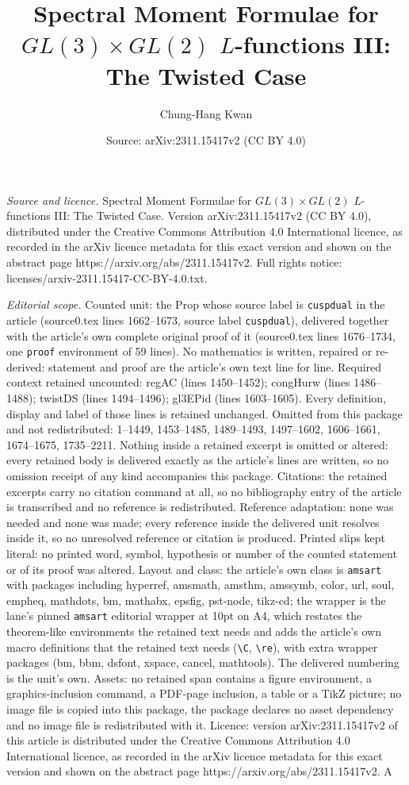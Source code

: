 \documentclass[10pt,a4paper]{amsart}
\title[Spectral Moment Formulae for $GL(3)\times GL(2)$ $L$-functio]{Spectral Moment Formulae for $GL(3)\times GL(2)$ $L$-functions III: The Twisted Case}
\author{Chung-Hang Kwan}
\date{Source: arXiv:2311.15417v2 (CC BY 4.0)}
\begin{document}
\maketitle

\noindent\emph{Source and licence.} Spectral Moment Formulae for $GL(3)\times GL(2)$ $L$-functions III: The Twisted Case. Version arXiv:2311.15417v2 (CC BY 4.0), distributed under the Creative Commons Attribution 4.0 International licence, as recorded in the arXiv licence metadata for this exact version and shown on the abstract page https://arxiv.org/abs/2311.15417v2. Full rights notice: licenses/arxiv-2311.15417-CC-BY-4.0.txt.\par\smallskip

\noindent\textit{Editorial scope.} Counted unit: the Prop whose source label is \texttt{cuspdual} in the article (source0.tex lines 1662--1673, source label \texttt{cuspdual}), delivered together with the article's own complete original proof of it (source0.tex lines 1676--1734, one \texttt{proof} environment of 59 lines). No mathematics is written, repaired or re-derived: statement and proof are the article's own text line for line. Required context retained uncounted: regAC (lines 1450--1452); congHurw (lines 1486--1488); twistDS (lines 1494--1496); gl3EPid (lines 1603--1605). Every definition, display and label of those lines is retained unchanged. Omitted from this package and not redistributed: 1--1449, 1453--1485, 1489--1493, 1497--1602, 1606--1661, 1674--1675, 1735--2211. Nothing inside a retained excerpt is omitted or altered: every retained body is delivered exactly as the article's lines are written, so no omission receipt of any kind accompanies this package. Citations: the retained excerpts carry no citation command at all, so no bibliography entry of the article is transcribed and no reference is redistributed. Reference adaptation: none was needed and none was made; every reference inside the delivered unit resolves inside it, so no unresolved reference or citation is produced. Printed slips kept literal: no printed word, symbol, hypothesis or number of the counted statement or of its proof was altered. Layout and class: the article's own class is \texttt{amsart} with packages including hyperref, amsmath, amsthm, amssymb, color, url, soul, empheq, mathdots, bm, mathabx, epsfig, pst-node, tikz-cd; the wrapper is the lane's pinned \texttt{amsart} editorial wrapper at 10pt on A4, which restates the theorem-like environments the retained text needs and adds the article's own macro definitions that the retained text needs (\texttt{\textbackslash C}, \texttt{\textbackslash re}), with extra wrapper packages (bm, bbm, dsfont, xspace, cancel, mathtools). The delivered numbering is the unit's own. Assets: no retained span contains a figure environment, a graphics-inclusion command, a PDF-page inclusion, a table or a TikZ picture; no image file is copied into this package, the package declares no asset dependency and no image file is redistributed with it. Licence: version arXiv:2311.15417v2 of this article is distributed under the Creative Commons Attribution 4.0 International licence, as recorded in the arXiv licence metadata for this exact version and shown on the abstract page https://arxiv.org/abs/2311.15417v2. A 
\end{document}
